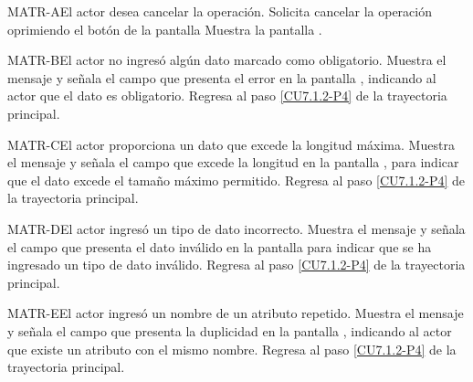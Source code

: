 	\begin{UCtrayectoriaA}{MATR-A}{El actor desea cancelar la operación.}
		\UCpaso[\UCactor] Solicita cancelar la operación oprimiendo el botón  de la pantalla 
		\UCpaso[\UCsist] Muestra la pantalla .
	\end{UCtrayectoriaA}

	\begin{UCtrayectoriaA}{MATR-B}{El actor no ingresó algún dato marcado como obligatorio.}
		\UCpaso[\UCsist] Muestra el mensaje  y señala el campo que presenta el error en la pantalla , indicando al actor que el dato es obligatorio.
		\UCpaso Regresa al paso \ref{CU7.1.2-P4} de la trayectoria principal.
	\end{UCtrayectoriaA}

	\begin{UCtrayectoriaA}{MATR-C}{El actor proporciona un dato que excede la longitud máxima.}
		\UCpaso[\UCsist] Muestra el mensaje  y señala el campo que excede la longitud en la pantalla , para indicar que el dato excede el tamaño máximo permitido.
		\UCpaso Regresa al paso \ref{CU7.1.2-P4} de la trayectoria principal.
	\end{UCtrayectoriaA}
	
	\begin{UCtrayectoriaA}{MATR-D}{El actor ingresó un tipo de dato incorrecto.}
		\UCpaso[\UCsist] Muestra el mensaje  y señala el campo que presenta el dato inválido en la pantalla  para indicar que se ha ingresado un tipo de dato inválido.
		\UCpaso Regresa al paso \ref{CU7.1.2-P4} de la trayectoria principal.
	\end{UCtrayectoriaA}
	
	\begin{UCtrayectoriaA}{MATR-E}{El actor ingresó un nombre de un atributo repetido.}
		\UCpaso[\UCsist] Muestra el mensaje  y señala el campo que presenta la duplicidad en la pantalla , indicando al actor que existe un atributo con el mismo nombre.
		\UCpaso Regresa al paso \ref{CU7.1.2-P4} de la trayectoria principal.
	\end{UCtrayectoriaA}

